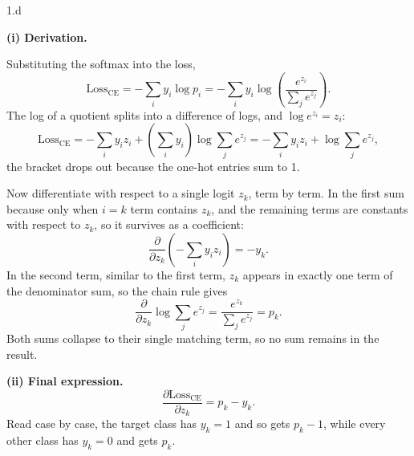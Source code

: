 \LARGE
1.d
\normalsize

\begin{answer}
  \textbf{(i) Derivation.}

  \medskip
  Substituting the softmax into the loss,
  \[
    \text{Loss}_{\text{CE}}
      = -\sum_i y_i \log p_i
      = -\sum_i y_i \log\!\left(\frac{e^{z_i}}{\sum_j e^{z_j}}\right).
  \]
  The log of a quotient splits into a difference of logs, and $\log e^{z_i} = z_i$:
  \[
    \text{Loss}_{\text{CE}}
      = -\sum_i y_i z_i + \left(\sum_i y_i\right) \log \sum_j e^{z_j}
      = -\sum_i y_i z_i + \log \sum_j e^{z_j},
  \]
  the bracket drops out because the one-hot entries sum to 1. 

  \medskip
  Now differentiate with respect to a single logit $z_k$, term by term. In the first sum because only when
  $i = k$ term contains $z_k$, and the remaining terms are constants with respect to $z_k$, so it
  survives as a coefficient:
  \[
    \frac{\partial}{\partial z_k}\left(-\sum_i y_i z_i\right) = -y_k .
  \]
  In the second term, similar to the first term, $z_k$ appears in exactly one term of the denominator sum, so the chain rule
  gives
  \[
    \frac{\partial}{\partial z_k} \log \sum_j e^{z_j}
      = \frac{e^{z_k}}{\sum_j e^{z_j}} = p_k .
  \]
  Both sums collapse to their single matching term, so no sum remains in the result.

  \medskip
  \textbf{(ii) Final expression.}
  \[
    \frac{\partial \text{Loss}_{\text{CE}}}{\partial z_k} = p_k - y_k .
  \]
  Read case by case, the target class has $y_k = 1$ and so gets $p_k - 1$, while every other class
  has $y_k = 0$ and gets $p_k$.


\end{answer}

